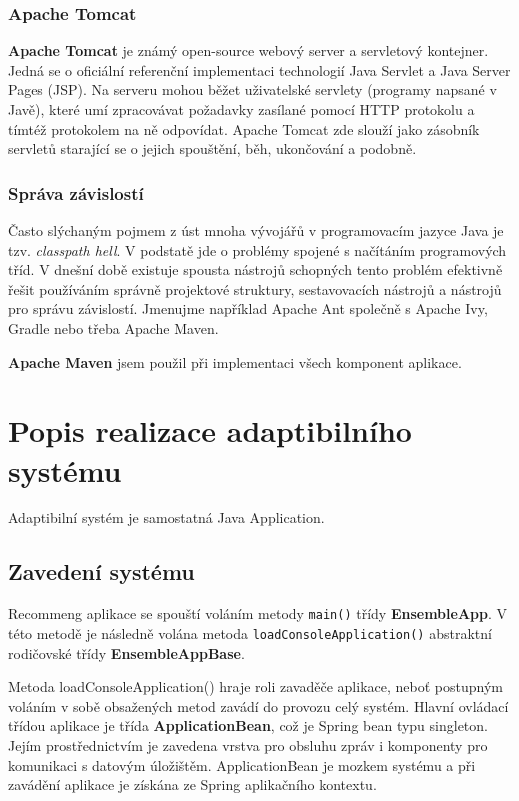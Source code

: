 \documentclass[thesis=M,czech]{FITthesis}[2014/05/07]
\begin{document}
\subsubsection{Apache Tomcat}
\textbf{Apache Tomcat} je známý open-source webový server a servletový kontejner. Jedná se o oficiální referenční implementaci technologií Java Servlet a Java Server Pages (JSP). Na serveru mohou běžet uživatelské servlety (programy napsané v Javě), které umí zpracovávat požadavky zasílané pomocí HTTP protokolu a tímtéž protokolem na ně odpovídat. Apache Tomcat zde slouží jako zásobník servletů starající se o jejich spouštění, běh, ukončování a podobně.

\subsubsection{Správa závislostí}
Často slýchaným pojmem z úst mnoha vývojářů v programovacím jazyce Java je tzv. \emph{classpath hell}. V podstatě jde o problémy spojené s načítáním programových tříd. V dnešní době existuje spousta nástrojů schopných tento problém efektivně řešit používáním správně projektové struktury, sestavovacích nástrojů a nástrojů pro správu závislostí. Jmenujme například Apache Ant společně s Apache Ivy, Gradle nebo třeba Apache Maven.

\textbf{Apache Maven} jsem použil při implementaci všech komponent aplikace.

\section{Popis realizace adaptibilního systému}
\label{sec:impl}

Adaptibilní systém je samostatná Java Application.

\subsection{Zavedení systému}
Recommeng aplikace se spouští voláním metody \texttt{main()} třídy \textbf{EnsembleApp}. V této metodě je následně volána metoda \texttt{loadConsoleApplication()} abstraktní rodičovské třídy \textbf{EnsembleAppBase}.

Metoda loadConsoleApplication() hraje roli zavaděče aplikace, neboť postupným voláním v sobě obsažených metod zavádí do provozu celý systém. Hlavní ovládací třídou aplikace je třída \textbf{ApplicationBean}, což je Spring bean typu singleton. Jejím prostřednictvím je zavedena vrstva pro obsluhu zpráv i komponenty pro komunikaci s datovým úložištěm. ApplicationBean je mozkem systému a při zavádění aplikace je získána ze Spring aplikačního kontextu.
\end{document}
